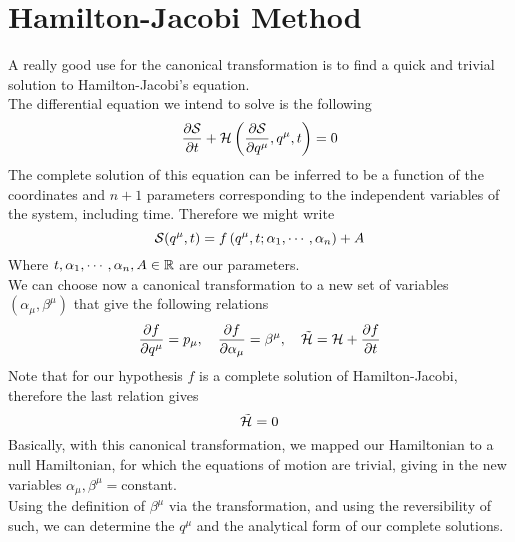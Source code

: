 \documentclass[../admech.tex]{subfiles}
\begin{document}
\section{Hamilton-Jacobi Method}
A really good use for the canonical transformation is to find a quick and trivial solution to Hamilton-Jacobi's equation.\\
The differential equation we intend to solve is the following
\begin{equation}
	\pdv{\mathcal{S}}{t}+\mathcal{H}\left( \pdv{\mathcal{S}}{q^\mu},q^\mu,t \right)=0
	\label{eq:hjctr}
\end{equation}
The complete solution of this equation can be inferred to be a function of the coordinates and $n+1$ parameters corresponding to the independent variables of the system, including time. Therefore we might write
\begin{equation}
	\mathcal{S}(q^\mu,t)=f\left( q^\mu,t;\alpha_1,\cdots,\alpha_n \right)+A
	\label{eq:hjsolution}
\end{equation}
Where $t,\alpha_1,\cdots,\alpha_n,A\in\operatorname{\mathbb{R}}$ are our parameters.\\
We can choose now a canonical transformation to a new set of variables $(\alpha_\mu,\beta^\mu)$ that give the following relations
\begin{equation}
	\pdv{f}{q^\mu}=p_\mu,\quad\pdv{f}{\alpha_\mu}=\beta^\mu,\quad\tilde{\mathcal{H}}=\mathcal{H}+\pdv{f}{t}
	\label{eq:cantrasf}
\end{equation}
Note that for our hypothesis $f$ is a complete solution of Hamilton-Jacobi, therefore the last relation gives
\begin{equation*}
	\tilde{\mathcal{H}}=0
\end{equation*}
Basically, with this canonical transformation, we mapped our Hamiltonian to a null Hamiltonian, for which the equations of motion are trivial, giving in the new variables $\alpha_\mu,\beta^\mu=$constant.\\
Using the definition of $\beta^\mu$ via the transformation, and using the reversibility of such, we can determine the $q^\mu$ and the analytical form of our complete solutions.
\end{document}
